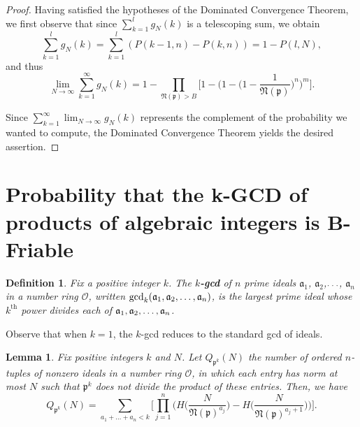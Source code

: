 \documentclass[12pt]{amsart}
\newtheorem{lemma}[theorem]{Lemma}
\newtheorem{definition}[theorem]{Definition}
\theoremstyle{definition}
\newcommand{\f}[1]{\mathfrak{#1}}
\begin{document}
\begin{proof}
	Having satisfied the hypotheses of the Dominated Convergence Theorem, we first observe that since $\sum_{k=1}^l g_N(k)$ is a telescoping sum, we obtain
	$$\sum_{k=1}^l g_N(k) = \sum_{k=1}^l (P(k-1, n) - P(k, n)) = 1 - P(l,N),$$ 
	and thus
	$$\lim_{N \to \infty} \sum_{k=1}^{\infty} g_N(k) = 1 - \prod_{\mathfrak{N}(\mathfrak{p}) > B} \Big[1 - \Big(1 - \Big(1 - \frac{1}{\mathfrak{N}(\mathfrak{p})}  \Big)^n\Big)^m\Big].$$
	
	\noindent Since $\displaystyle \sum_{k=1}^{\infty} \lim_{N \to \infty} g_N(k)$ represents the complement of the probability we wanted to compute, the Dominated Convergence Theorem yields the desired assertion.
\end{proof}


\section{Probability that the k-GCD of products of algebraic integers is B-Friable}

\begin{definition} Fix a positive integer $k$. The \textbf{$k$-gcd} of $n$ prime ideals $\f{a}_1$, $\f{a}_2$,$\mathellipsis$, $\f{a}_n$ in a number ring $\mathcal{O}$, written $\gcd_k(\f{a}_1,\f{a}_2, \mathellipsis,\f{a}_n)$, is the largest prime ideal whose $k^{\text{th}}$ power divides each of $\f{a}_1, \f{a}_2,\mathellipsis, \f{a}_n$.
\end{definition}	

\noindent Observe that when $k=1$, the $k$-gcd reduces to the standard gcd of ideals.

\begin{lemma}
	Fix positive integers $k$ and $N$. Let $Q_{\f{p}^k}(N)$ the number of ordered $n$-tuples of nonzero ideals in a number ring $\mathcal{O}$, in which each entry has norm at most $N$ such that $\f{p}^k$ does not divide the product of these entries. Then, we have
	$$Q_{\f{p}^k}(N) = \sum_{a_1+...+a_n < k} \Big[\prod_{j=1}^n \Big(H\bigg( \frac{N}{\f{N}(\f{p})^{a_j}}\bigg) - H\bigg(\frac{N}{\f{N}(\f{p})^{a_j + 1}}\bigg)\Big)\Big].$$
\end{lemma}
\end{document}
